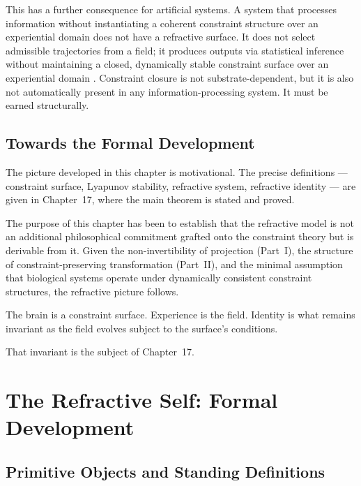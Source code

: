 \documentclass[11pt,openany]{book}
\begin{document}
This has a further consequence for artificial systems.  A
system that processes information without instantiating a
coherent constraint structure over an experiential domain
does not have a refractive surface.  It does not select
admissible trajectories from a field; it produces outputs
via statistical inference without maintaining a closed,
dynamically stable constraint surface over an experiential
domain \citep{thompson2023blindspot}.  Constraint closure
is not substrate-dependent, but it is also not
automatically present in any information-processing system.
It must be earned structurally.

\section{Towards the Formal Development}
\label{sec:towards-formal}

The picture developed in this chapter is motivational.  The
precise definitions --- constraint surface, Lyapunov
stability, refractive system, refractive identity --- are
given in Chapter~17, where the main theorem is stated and
proved.

The purpose of this chapter has been to establish that the
refractive model is not an additional philosophical
commitment grafted onto the constraint theory but is
derivable from it.  Given the non-invertibility of
projection (Part~I), the structure of
constraint-preserving transformation (Part~II), and the
minimal assumption that biological systems operate under
dynamically consistent constraint structures, the refractive
picture follows.

The brain is a constraint surface.  Experience is the
field.  Identity is what remains invariant as the field
evolves subject to the surface's conditions.

That invariant is the subject of Chapter~17.


\chapter{The Refractive Self: Formal Development}
\label{ch:refractive-self}

\section{Primitive Objects and Standing Definitions}
\label{sec:primitives}
\end{document}

